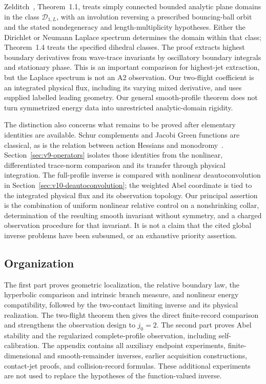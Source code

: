 Zelditch~\cite{Zelditch}, Theorem~1.1, treats simply connected bounded
analytic plane domains in the class $\mathcal D_{1,L}$, with an
involution reversing a prescribed bouncing-ball orbit and the stated
nondegeneracy and length-multiplicity hypotheses. Either the Dirichlet
or Neumann Laplace spectrum determines the domain within that class;
Theorem~1.4 treats the specified dihedral classes. The proof extracts
highest boundary derivatives from wave-trace invariants by oscillatory
boundary integrals and stationary phase. This is an important comparison
for highest-jet extraction, but the Laplace spectrum is not an A2
observation. Our two-flight coefficient is an integrated physical flux,
including its varying mixed derivative, and uses supplied labelled
leading geometry. Our general smooth-profile theorem does not turn
symmetrized energy data into unrestricted analytic-domain rigidity.

The distinction also concerns what remains to be proved after elementary
identities are available. Schur complements and Jacobi Green functions
are classical, as is the relation between action Hessians and
monodromy~\cite{Hill}. Section~\ref{sec:v9-operators} isolates those
identities from the nonlinear, differentiated trace-norm comparison
and its transfer through physical integration. The full-profile inverse
is compared with nonlinear deautoconvolution in
Section~\ref{sec:v10-deautoconvolution}; the weighted Abel coordinate
is tied to the integrated physical flux and its observation topology.
Our principal assertion is the combination of uniform nonlinear relative
control on a nonshrinking collar, determination of the resulting
smooth invariant without symmetry, and a charged observation procedure
for that invariant. It is not a claim that the cited global inverse
problems have been subsumed, or an exhaustive priority assertion.

\subsection{Organization}
The first part proves geometric localization, the relative boundary law,
the hyperbolic comparison and intrinsic branch measure, and nonlinear
energy compatibility, followed by the two-contact limiting
inverse and its physical realization. The two-flight theorem then gives
the direct finite-record comparison and strengthens the observation
design to $j_0=2$. The second part proves Abel stability and the
regularized complete-profile observation, including self-calibration.
The appendix contains all auxiliary endpoint experiments,
finite-dimensional and smooth-remainder inverses, earlier acquisition
constructions, contact-jet proofs, and collision-record formulas.
These additional experiments are not used to replace the hypotheses
of the function-valued inverse.
